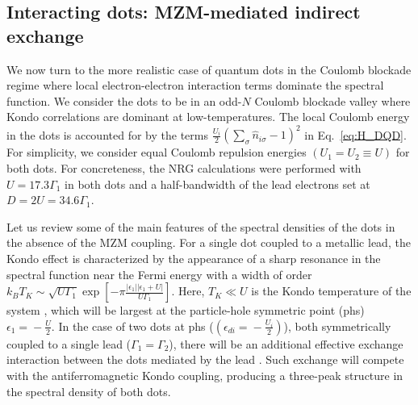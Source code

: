 \documentclass[showpacs,aps,prb,reprint,superscriptaddress]{revtex4-2}
\begin{document}

\subsection{Interacting dots: MZM-mediated indirect exchange \label{subsec:IndirectExchange}}


We now turn to the more realistic case of quantum dots in the Coulomb blockade regime where local electron-electron interaction terms dominate the spectral function. We consider the dots to be in an odd-$N$ Coulomb blockade valley where Kondo correlations are dominant at low-temperatures. The local Coulomb energy in the dots is accounted for by the terms $\frac{U_i}{2}(\sum_{\sigma} \hat{n}_{i\sigma}-1)^{2}$ in Eq.\ \eqref{eq:H_DQD}. For simplicity, we consider equal Coulomb repulsion energies $(U_1 \!=\! U_2 \equiv U)$ for both dots. For concreteness, the NRG calculations were performed with $U \!=\! 17.3\Gamma_1$ in both dots and a half-bandwidth of the lead electrons set at $D=2U=34.6\Gamma_1$. 


Let us review some of the main features of the spectral densities of the dots in the absence of the MZM coupling. For a single dot coupled to a metallic lead, the Kondo effect is characterized by the appearance of a sharp resonance in the spectral function near the Fermi energy with a width of order $k_B T_K \!\sim\! \sqrt{U \Gamma_1} \exp \left[- \pi\frac{|\epsilon_1| |\epsilon_1 + U|}{U \Gamma_1}  \right]$. Here, $T_K \ll U$ is the Kondo temperature  of the system \cite{hewson_kondo_1997}, which will be largest at the particle-hole symmetric point (phs)  $\epsilon_1 \!=\!-\frac{U}{2}$. In the case of two dots at phs ($\left(\epsilon_{di}\!=\! -\frac{U_i}{2}\right)$), both symmetrically coupled to a single lead ($\Gamma_1\!=\!\Gamma_2$), there will be an additional effective exchange interaction between the dots mediated by the lead \cite{Liao:JournalofMagnetismandMagneticMaterials:377:354-361:2015}. Such exchange will compete with the antiferromagnetic Kondo coupling, producing a three-peak structure in the spectral density of both dots. 
\end{document}
